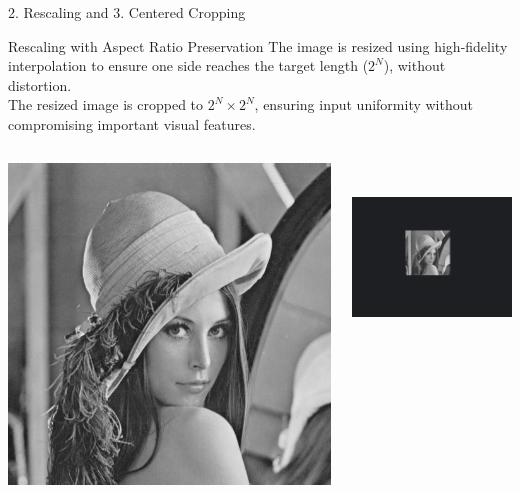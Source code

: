 \documentclass{beamer}
\begin{document}
\begin{frame}{2. Rescaling and 3. Centered Cropping}
    \begin{block}{Rescaling with Aspect Ratio Preservation}
        The image is resized using high-fidelity interpolation to ensure one side reaches the target length ($2^N$), without distortion. \\
        The resized image is cropped to $2^N \times 2^N$, ensuring input uniformity without compromising important visual features.
    \end{block}

    \vspace{0.3cm}
    \begin{columns}
        \centering
        \includegraphics[width=\linewidth]{fig/gray.jpg}

        \centering
        \includegraphics[width=\linewidth, height=5cm]{fig/shuoxiao.png}
    \end{columns}
\end{frame}
\end{document}
